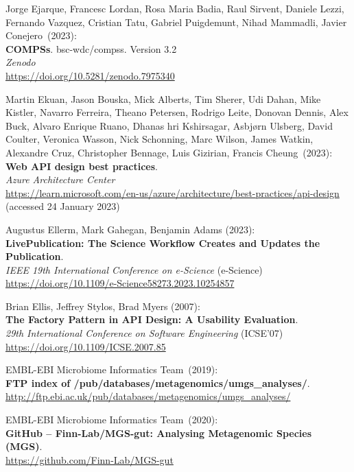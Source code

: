\begin{thebibliography}{9}
Jorge Ejarque, Francesc Lordan, Rosa Maria Badia, Raul Sirvent, Daniele Lezzi, Fernando Vazquez, Cristian Tatu,  Gabriel Puigdemunt, Nihad Mammadli, Javier Conejero~(2023): \\
\textbf{COMPSs}. bsc-wdc/compss. Version 3.2\\
\emph{Zenodo} \\
\url{https://doi.org/10.5281/zenodo.7975340}

Martin Ekuan, Jason Bouska, Mick Alberts, Tim Sherer, Udi Dahan, Mike Kistler, Navarro Ferreira, Theano Petersen, Rodrigo Leite, Donovan Dennis, Alex Buck, Alvaro Enrique Ruano, Dhanas
hri Kshirsagar, Asbjørn Ulsberg, David Coulter, Veronica Wasson, Nick Schonning, Marc Wilson, James Watkin, Alexandre Cruz, Christopher Bennage, Luis Gizirian, Francis Cheung~(2023): \\
\textbf{Web {API} design best practices}.\\
\emph{Azure Architecture Center}\\
\url{https://learn.microsoft.com/en-us/azure/architecture/best-practices/api-design}
(accessed 24 January 2023)

Augustus Ellerm, Mark Gahegan, Benjamin Adams (2023):\\
\textbf{LivePublication: The Science Workflow Creates and Updates the Publication}.\\
\emph{IEEE 19th International Conference on e-Science} (e-Science) \\
\url{https://doi.org/10.1109/e-Science58273.2023.10254857}

Brian Ellis, Jeffrey Stylos, Brad Myers (2007):\\
\textbf{The Factory Pattern in API Design: A Usability Evaluation}.\\
\emph{29th International Conference on Software Engineering} (ICSE'07)\\
\url{https://doi.org/10.1109/ICSE.2007.85}

EMBL-EBI Microbiome Informatics Team~(2019): \\
\textbf{FTP index of /pub/databases/metagenomics/umgs\_analyses/}.\\
\url{http://ftp.ebi.ac.uk/pub/databases/metagenomics/umgs_analyses/}

EMBL-EBI Microbiome Informatics Team~(2020): \\
\textbf{GitHub -- Finn-Lab/MGS-gut: Analysing Metagenomic Species (MGS)}.\\
\url{https://github.com/Finn-Lab/MGS-gut}


\end{thebibliography}
